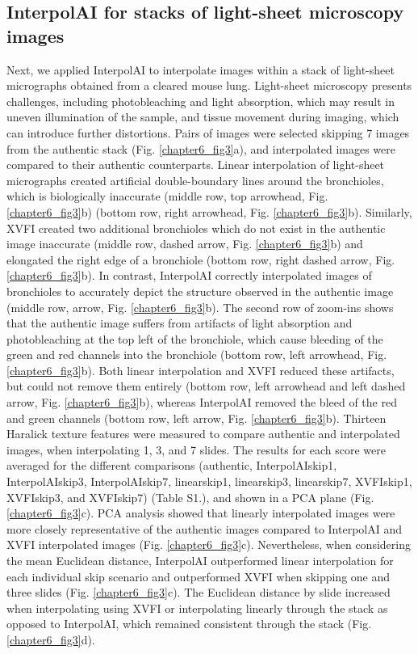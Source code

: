 \begin{refsection}
    \section{InterpolAI for stacks of light-sheet microscopy images}
    Next, we applied InterpolAI to interpolate images within a stack of light-sheet micrographs obtained from a cleared mouse lung. Light-sheet microscopy presents challenges, including photobleaching and light absorption, which may result in uneven illumination of the sample, and tissue movement during imaging, which can introduce further distortions. Pairs of images were selected skipping 7 images from the authentic stack (Fig. \ref{chapter6_fig3}a), and interpolated images were compared to their authentic counterparts.    
    Linear interpolation of light-sheet micrographs created artificial double-boundary lines around the bronchioles, which is biologically inaccurate (middle row, top arrowhead, Fig. \ref{chapter6_fig3}b) (bottom row, right arrowhead, Fig. \ref{chapter6_fig3}b). Similarly, XVFI created two additional bronchioles which do not exist in the authentic image inaccurate (middle row, dashed arrow, Fig. \ref{chapter6_fig3}b) and elongated the right edge of a bronchiole (bottom row, right dashed arrow, Fig. \ref{chapter6_fig3}b). In contrast, InterpolAI correctly interpolated images of bronchioles to accurately depict the structure observed in the authentic image (middle row, arrow, Fig. \ref{chapter6_fig3}b). The second row of zoom-ins shows that the authentic image suffers from artifacts of light absorption and photobleaching at the top left of the bronchiole, which cause bleeding of the green and red channels into the bronchiole (bottom row, left arrowhead, Fig. \ref{chapter6_fig3}b). Both linear interpolation and XVFI reduced these artifacts, but could not remove them entirely (bottom row, left arrowhead and left dashed arrow, Fig. \ref{chapter6_fig3}b), whereas InterpolAI removed the bleed of the red and green channels (bottom row, left arrow, Fig. \ref{chapter6_fig3}b). 
    Thirteen Haralick texture features were measured to compare authentic and interpolated images, when interpolating 1, 3, and 7 slides. The results for each score were averaged for the different comparisons (authentic, InterpolAIskip1, InterpolAIskip3, InterpolAIskip7, linearskip1, linearskip3, linearskip7, XVFIskip1, XVFIskip3, and XVFIskip7) (Table S1.), and shown in a PCA plane (Fig. \ref{chapter6_fig3}c). PCA analysis showed that linearly interpolated images were more closely representative of the authentic images compared to InterpolAI and XVFI interpolated images (Fig. \ref{chapter6_fig3}c).  Nevertheless, when considering the mean Euclidean distance, InterpolAI outperformed linear interpolation for each individual skip scenario and outperformed XVFI when skipping one and three slides (Fig. \ref{chapter6_fig3}c). The Euclidean distance by slide increased when interpolating using XVFI or interpolating linearly through the stack as opposed to InterpolAI, which remained consistent through the stack (Fig. \ref{chapter6_fig3}d).

\end{refsection}
